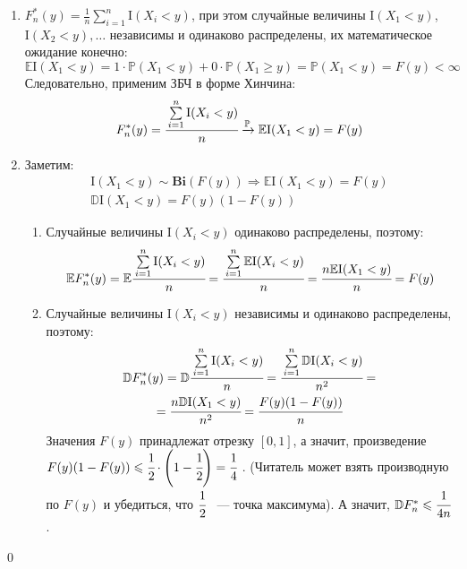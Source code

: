 \documentclass[oneside,final,14pt]{extreport}
\renewenvironment{proof}{{\bfseries Доказательство.}}{\qed}
\theoremstyle{plain}
\theoremstyle{definition}
\theoremstyle{named}
\begin{document}
\begin{proof}\leavevmode
\begin{enumerate}
    \item $F_{n}^{*}(y)=\frac{1}{n} \sum\limits_{i=1}^{n} \mathrm{I}(X_{i}<y)$, при этом случайные величины $\mathrm{I}(X_{1}<y)$, $\mathrm{I}(X_{2}<y), \ldots$ независимы и одинаково распределены, их математическое ожидание конечно:
    \begin{equation*}
        \mathbb{E}\mathrm{I}(X_{1}<y)=1 \cdot \mathbb{P}(X_{1}<y)+0 \cdot \mathbb{P}(X_{1} \geqslant y)=\mathbb{P}(X_{1}<y)=F(y)<\infty
    \end{equation*}
    Следовательно, применим ЗБЧ в форме Хинчина:
    \begin{equation*}
        F_{n}^{*}(y)=\cfrac{\sum\limits_{i=1}^{n} \mathrm{I}(X_{i}<y)}{n} \xrightarrow[]{\mathbb{P}} \mathbb{E}\mathrm{I}(X_{1}<y)=F(y) 
    \end{equation*}
    \item Заметим:
    \begin{gather*}
        \mathrm{I}(X_{1}<y) \sim  \mathbf{Bi}(F(y)) \Rightarrow \mathbb{E}\mathrm{I}(X_{1}<y) = F(y) \\
        \mathbb{D}\mathrm{I}(X_{1}<y) = F(y)(1-F(y))
    \end{gather*}
    \begin{enumerate}[label={\arabic*)}]
        \item Случайные величины $\mathrm{I}(X_{i}<y)$ одинаково распределены, поэтому:
        \begin{equation*}
            \mathbb{E} F_{n}^{*}(y)=\mathbb{E} \cfrac{\sum\limits_{i=1}^{n} \mathrm{I}(X_{i}<y)}{n}=\cfrac{\sum\limits_{i=1}^{n} \mathbb{E}\mathrm{I}(X_{i}<y)}{n}=\cfrac{n \mathbb{E}\mathrm{I}(X_{1}<y)}{n}=F(y)  
        \end{equation*}
        
        \item Случайные величины $\mathrm{I}(X_{i}<y)$ независимы и одинаково распределены, поэтому:
        \begin{multline*}
            \mathbb{D}F_{n}^{*}(y)
            = \mathbb{D} \cfrac{\sum\limits_{i=1}^{n} \mathrm{I}(X_{i}<y)}{n}
            = \cfrac{\sum\limits_{i=1}^{n} \mathbb{D}\mathrm{I}(X_{i}<y)}{n^{2}}
            = \\
            = \cfrac{n\mathbb{D}\mathrm{I}(X_{1}<y)}{n^{2}}
            = \cfrac{F(y)(1-F(y))}{n}
        \end{multline*}
        Значения $F(y)$ принадлежат отрезку $[0, 1]$, а значит, произведение $F(y)(1 - F(y)) \leqslant \cfrac{1}{2}\cdot\left(1 - \cfrac{1}{2}\right) = \cfrac{1}{4}~$. (Читатель может взять производную по $F(y)$ и убедиться, что $\cfrac{1}{2}$ ~--- точка максимума). А значит, $\mathbb{D}F_{n}^{*} \leqslant \cfrac{1}{4n}$. 
        

\end{enumerate}
\end{enumerate}
\end{proof}
\end{document}
